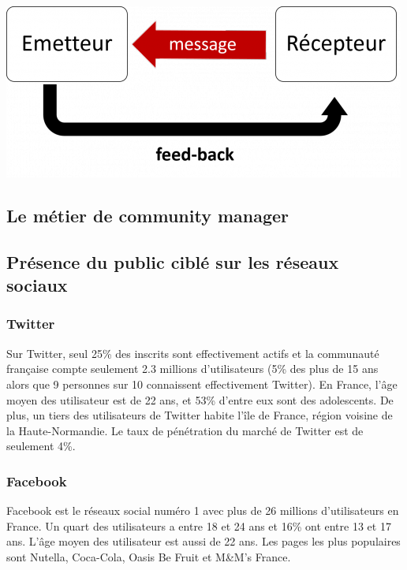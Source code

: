 \begin{center}
\includegraphics[scale=0.5]{./image/communication_digitale.png}
\end{center}

\subsection{Le métier de community manager}


\subsection{Présence du public ciblé sur les réseaux sociaux}
\subsubsection{Twitter}
Sur Twitter, seul 25\% des inscrits sont effectivement actifs et la communauté française compte seulement 2.3 millions d'utilisateurs (5\% des plus de 15 ans alors que 9 personnes sur 10 connaissent effectivement Twitter).
En France, l'âge moyen des utilisateur est de 22 ans, et 53\% d'entre eux sont des adolescents. De plus, un tiers des utilisateurs de Twitter habite l'île de France, région voisine de la Haute-Normandie. Le taux de pénétration du marché de Twitter est de seulement 4\%.

\subsubsection{Facebook}
Facebook est le réseaux social numéro 1 avec plus de 26 millions d'utilisateurs en France. Un quart des utilisateurs a entre 18 et 24 ans et 16\% ont entre 13 et 17 ans. L'âge moyen des utilisateur est aussi de 22 ans.
Les pages les plus populaires sont Nutella, Coca-Cola, Oasis Be Fruit et M\&M's France. 